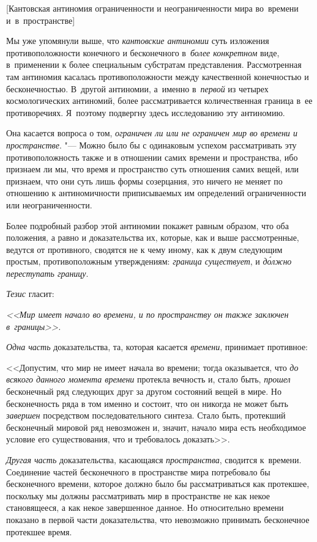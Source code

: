 \bigskip

%
{[Кантовская антиномия ограниченности и неограниченности мира во~времени
и~в~пространстве]}

Мы уже упомянули выше, что {\em кантовские антиномии} суть изложения
противоположности конечного и бесконечного в~{\em более конкретном} виде,
в~применении к более специальным субстратам представления. Рассмотренная там
антиномия касалась противоположности между качественной конечностью и
бесконечностью. В~другой антиномии, а~именно в~{\em первой} из четырех
космологических антиномий, более рассматривается количественная граница в~ее
противоречиях. Я~поэтому подвергну здесь исследованию эту антиномию.

Она касается вопроса о том,
{\em ограничен ли или не ограничен мир во времени и пространстве}. "--- Можно
было бы с одинаковым успехом рассматривать эту противоположность также
и в отношении самих времени и пространства, ибо признаем ли мы, что время
и пространство суть отношения самих вещей, или признаем, что они суть лишь
формы созерцания, это ничего не меняет по отношению к антиномичности
приписываемых им определений ограниченности или неограниченности.

Более подробный разбор этой антиномии покажет равным образом, что оба
положения, а равно и доказательства их, которые, как и выше рассмотренные,
ведутся от противного, сводятся не к чему иному, как к двум следующим простым,
противоположным утверждениям: {\em граница существует}, и
{\em д\'{о}лжно переступать границу}.

{\em Тезис} гласит:

{\em <<Мир имеет начало во времени, и по пространству он
также заключен в~границы>>.}

{\em Одна часть} доказательства, та, которая касается
{\em времени}, принимает противное:

<<Допустим, что мир не имеет начала во времени; тогда оказывается, что
{\em до всякого данного момента времени} протекла вечность и, стало быть,
{\em прошел} бесконечный ряд следующих друг за другом состояний вещей в мире.
Но бесконечность ряда в том именно и состоит, что он никогда не может быть
{\em завершен} посредством последовательного синтеза. Стало быть, протекший
бесконечный мировой ряд невозможен и, значит, начало мира есть необходимое
условие его существования, что и требовалось доказать>>.

{\em Другая часть} доказательства, касающаяся {\em пространства}, сводится
к~времени. Соединение частей бесконечного в пространстве мира потребовало бы
бесконечного времени, которое должно было бы рассматриваться как протекшее,
поскольку мы должны рассматривать мир в пространстве не как некое становящееся,
а как некое завершенное данное. Но относительно времени показано в первой части
доказательства, что невозможно принимать бесконечное протекшее время.

